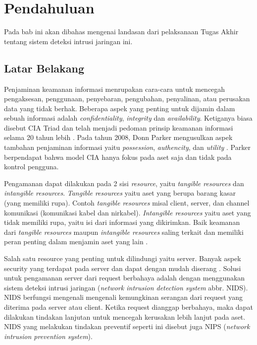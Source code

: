\chapter{Pendahuluan}

Pada bab ini akan dibahas mengenai landasan dari pelaksanaan Tugas Akhir tentang sistem deteksi intrusi jaringan ini.

\section{Latar Belakang}

Penjaminan keamanan informasi menrupakan cara-cara untuk mencegah pengaksesan, penggunaan, penyebaran, pengubahan, penyalinan, atau perusakan data yang tidak berhak. Beberapa aspek yang penting untuk dijamin dalam sebuah informasi adalah \emph{confidentiality}, \emph{integrity} dan \emph{availability}. Ketiganya biasa disebut CIA Triad dan telah menjadi pedoman prinsip keamanan informasi selama 20 tahun lebih \parencite{perrin2008}. Pada tahun 2008, Donn Parker mengusulkan aspek tambahan penjaminan informasi yaitu \emph{possession}, \emph{authencity}, dan \emph{utility} \parencite{parker1998}. Parker berpendapat bahwa model CIA hanya fokus pada aset saja dan tidak pada kontrol pengguna.

Pengamanan dapat dilakukan pada 2 sisi \emph{resource}, yaitu \emph{tangible resources} dan \emph{intangible resources}. \emph{Tangible resources} yaitu aset yang berupa barang kasar (yang memiliki rupa). Contoh \emph{tangible resources} misal client, server, dan channel komunikasi (komunikasi kabel dan nirkabel). \emph{Intangible resources} yaitu aset yang tidak memiliki rupa, yaitu isi dari informasi yang dikirimkan. Baik keamanan dari \emph{tangible resources} maupun \emph{intangible resources} saling terkait dan memiliki peran penting dalam menjamin aset yang lain \parencite{kizza2015}.

Salah satu resource yang penting untuk dilindungi yaitu server. Banyak aspek security yang terdapat pada server dan dapat dengan mudah diserang \parencite{owasp2013}. Solusi untuk pengamanan server dari request berbahaya adalah dengan menggunakan sistem deteksi intrusi jaringan (\emph{network intrusion detection system} abbr. NIDS). NIDS berfungsi mengenali mengenali kemungkinan serangan dari request yang diterima pada server atau client. Ketika request dianggap berbahaya, maka dapat dilakukan tindakan lanjutan untuk mencegah kerusakan lebih lanjut pada aset. NIDS yang melakukan tindakan preventif seperti ini disebut juga NIPS (\emph{network intrusion prevention system}).

